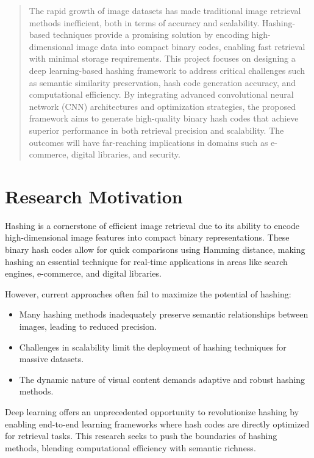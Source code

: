 \documentclass[conference]{IEEEtran}
\begin{document}
\begin{abstract}
The rapid growth of image datasets has made traditional image retrieval methods inefficient, 
both in terms of accuracy and scalability. Hashing-based techniques provide a promising solution by 
encoding high-dimensional image data into compact binary codes, enabling fast retrieval with minimal 
storage requirements. This project focuses on designing a deep learning-based hashing framework to address 
critical challenges such as semantic similarity preservation, hash code generation accuracy, 
and computational efficiency. 
By integrating advanced convolutional neural network (CNN) architectures and optimization strategies, 
the proposed framework aims to generate high-quality binary hash codes that achieve superior performance 
in both retrieval precision and scalability. The outcomes will have far-reaching implications in domains 
such as e-commerce, digital libraries, and security.

\end{abstract}

\begin{IEEEkeywords}

\end{IEEEkeywords}

\section{Research Motivation}

Hashing is a cornerstone of efficient image retrieval due to its ability to encode high-dimensional image features 
into compact binary representations. These binary hash codes allow for quick comparisons using Hamming distance, 
making hashing an essential technique for real-time applications in areas like search engines, e-commerce, and digital 
libraries.

However, current approaches often fail to maximize the potential of hashing:
\begin{itemize}
    \item Many hashing methods inadequately preserve semantic relationships between images, leading to reduced precision.
    \item Challenges in scalability limit the deployment of hashing techniques for massive datasets.
    \item The dynamic nature of visual content demands adaptive and robust hashing methods.
\end{itemize}

Deep learning offers an unprecedented opportunity to revolutionize hashing by enabling end-to-end learning frameworks 
where hash codes are directly optimized for retrieval tasks. This research seeks to push the boundaries of hashing 
methods, blending computational efficiency with semantic richness.
\end{document}
